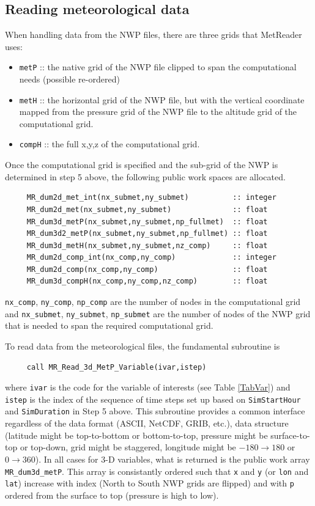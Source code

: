 \documentclass[11pt]{article}   %
\begin{document}
\subsection{Reading meteorological data}
When handling data from the NWP files, there are three grids that MetReader uses:
\begin{itemize}
\item \texttt{metP} :: the native grid of the NWP file clipped to span the
computational needs (possible re-ordered)
\item \texttt{metH} :: the horizontal grid of the NWP file, but with the vertical
coordinate mapped from the pressure grid of the NWP file to the altitude grid of 
the computational grid.
\item \texttt{compH} :: the full x,y,z of the computational grid.
\end{itemize}
Once the computational grid is specified and the sub-grid of the NWP is determined in 
step 5 above, the following public work spaces are allocated.
\begin{verbatim}
     MR_dum2d_met_int(nx_submet,ny_submet)          :: integer
     MR_dum2d_met(nx_submet,ny_submet)              :: float
     MR_dum3d_metP(nx_submet,ny_submet,np_fullmet)  :: float
     MR_dum3d2_metP(nx_submet,ny_submet,np_fullmet) :: float
     MR_dum3d_metH(nx_submet,ny_submet,nz_comp)     :: float
     MR_dum2d_comp_int(nx_comp,ny_comp)             :: integer
     MR_dum2d_comp(nx_comp,ny_comp)                 :: float
     MR_dum3d_compH(nx_comp,ny_comp,nz_comp)        :: float
\end{verbatim}
\texttt{nx\_comp}, \texttt{ny\_comp}, \texttt{np\_comp} are the number
of nodes in the computational grid and 
\texttt{nx\_submet}, \texttt{ny\_submet}, \texttt{np\_submet} are the
number of nodes of the NWP grid that is needed
to span the required computational grid.

To read data from the meteorological files, the fundamental subroutine is
\begin{verbatim}
     call MR_Read_3d_MetP_Variable(ivar,istep)
\end{verbatim}
where \texttt{ivar} is the code for the variable of interests
(see Table \ref{TabVar}) and
\texttt{istep} is the index of the sequence of time steps set up based on
\texttt{SimStartHour} and \texttt{SimDuration} in Step 5 above.  This subroutine provides
a common interface regardless of the data format (ASCII, NetCDF, GRIB, etc.), data
structure (latitude might be top-to-bottom or bottom-to-top, pressure might be surface-to-top
or top-down, grid might be staggered, longitude might be $-180 \rightarrow 180$ or $0 \rightarrow 360$).
In all cases for 3-D variables, what is returned is the public work array
\texttt{MR\_dum3d\_metP}.
This array is consistantly ordered such that \texttt{x}
and \texttt{y} (or \texttt{lon} and \texttt{lat}) increase with index (North to South NWP grids
are flipped) and with \texttt{p} ordered from the surface to top (pressure is high to low).
\end{document}
